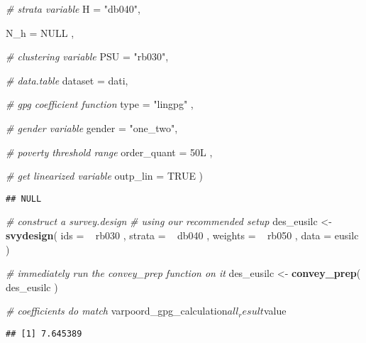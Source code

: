 \documentclass[]{book}
\newenvironment{Shaded}{\begin{snugshade}}{\end{snugshade}}
\newcommand{\KeywordTok}[1]{\textcolor[rgb]{0.13,0.29,0.53}{\textbf{{#1}}}}
\newcommand{\DataTypeTok}[1]{\textcolor[rgb]{0.13,0.29,0.53}{{#1}}}
\newcommand{\StringTok}[1]{\textcolor[rgb]{0.31,0.60,0.02}{{#1}}}
\newcommand{\CommentTok}[1]{\textcolor[rgb]{0.56,0.35,0.01}{\textit{{#1}}}}
\newcommand{\OtherTok}[1]{\textcolor[rgb]{0.56,0.35,0.01}{{#1}}}
\newcommand{\NormalTok}[1]{{#1}}
\begin{document}
\begin{Shaded}
\begin{Highlighting}[]
        \CommentTok{# strata variable}
        \DataTypeTok{H =} \StringTok{"db040"}\NormalTok{, }
        
        \DataTypeTok{N_h =} \OtherTok{NULL} \NormalTok{,}
        
        \CommentTok{# clustering variable}
        \DataTypeTok{PSU =} \StringTok{"rb030"}\NormalTok{, }
        
        \CommentTok{# data.table}
        \DataTypeTok{dataset =} \NormalTok{dati, }
        
        \CommentTok{# gpg coefficient function}
        \DataTypeTok{type =} \StringTok{"lingpg"} \NormalTok{,}
        
        \CommentTok{# gender variable}
        \DataTypeTok{gender =} \StringTok{"one_two"}\NormalTok{,}
      
      \CommentTok{# poverty threshold range}
      \DataTypeTok{order_quant =} \NormalTok{50L ,}
      
      \CommentTok{# get linearized variable}
      \DataTypeTok{outp_lin =} \OtherTok{TRUE}
    \NormalTok{)}
\end{Highlighting}
\end{Shaded}

\begin{verbatim}
## NULL
\end{verbatim}

\begin{Shaded}
\begin{Highlighting}[]
\CommentTok{# construct a survey.design}
\CommentTok{# using our recommended setup}
\NormalTok{des_eusilc <-}\StringTok{ }
\StringTok{    }\KeywordTok{svydesign}\NormalTok{( }
        \DataTypeTok{ids =} \NormalTok{~}\StringTok{ }\NormalTok{rb030 , }
        \DataTypeTok{strata =} \NormalTok{~}\StringTok{ }\NormalTok{db040 ,  }
        \DataTypeTok{weights =} \NormalTok{~}\StringTok{ }\NormalTok{rb050 , }
        \DataTypeTok{data =} \NormalTok{eusilc}
    \NormalTok{)}

\CommentTok{# immediately run the convey_prep function on it}
\NormalTok{des_eusilc <-}\StringTok{ }\KeywordTok{convey_prep}\NormalTok{( des_eusilc )}

\CommentTok{# coefficients do match}
\NormalTok{varpoord_gpg_calculation$all_result$value}
\end{Highlighting}
\end{Shaded}

\begin{verbatim}
## [1] 7.645389
\end{verbatim}
\end{document}
